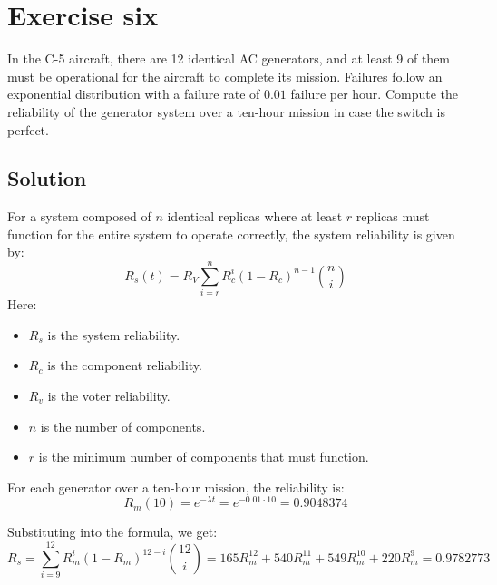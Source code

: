 \section{Exercise six}

In the C-5 aircraft, there are 12 identical AC generators, and at least 9 of them must be operational for the aircraft to complete its mission. 
Failures follow an exponential distribution with a failure rate of $0.01$ failure per hour.
Compute the reliability of the generator system over a ten-hour mission in case the switch is perfect.

\subsection*{Solution}
For a system composed of $n$ identical replicas where at least $r$ replicas must function for the entire system to operate correctly, the system reliability is given by:
\[R_s(t)=R_V\sum_{i=r}^{n}R_c^i(1-R_c)^{n-1}\binom{n}{i} \]
Here: 
\begin{itemize}
    \item $R_s$ is the system reliability. 
    \item $R_c$ is the component reliability. 
    \item $R_v$ is the voter reliability. 
    \item $n$ is the number of components. 
    \item $r$ is the minimum number of components that must function.
\end{itemize}

For each generator over a ten-hour mission, the reliability is:
\[R_m(10)=e^{-\lambda t}=e^{-0.01\cdot 10}=0.9048374\]

Substituting into the formula, we get:
\[R_s=\sum_{i=9}^12R_m^i\left(1-R_m\right)^{12-i}\binom{12}{i}=165R_m^{12}+540 R_m^{11}+549R_m^10 +220 R_m^9 =0.9782773\]